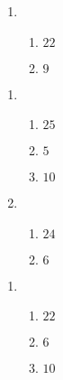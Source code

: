 \documentclass[12pt,twoside]{article}
\makeatletter
\def\emptycleardoublepage{\clearpage\if@twoside \ifodd\c@page\else
\thispagestyle{empty}%
\hbox{}\newpage\if@twocolumn\hbox{}\newpage\fi\fi\fi}
\makeatother
\begin{document}
\begin{multicols}{2}
\begin{enumerate}
\item \begin{enumerate}
\def \a{7}\def \b{15}\def \apb{22}
\item $\apb$
\def \a{3}\def \b{6}\def \ab{9}
\item $\ab$
\def \vshift{1}\def \hshift{2}\def \chang{2}\def \findval{4}\def \yval{-3}
\end{enumerate}
\end{enumerate}\end{multicols}\emptycleardoublepage{}\graphicspath{{C:/Users/iainc/anaconda3/Randomizer/Sample Course/Sample Assessment 2/}}\begin{multicols}{2} \begin{enumerate}
\item \begin{enumerate}
\def \a{9}\def \b{16}\def \apb{25}
\item $\apb$
\def \a{13}\def \dif{5}\def \b{8}
\item $\dif$
\def \a{3}\def \b{7}\def \ab{10}
\item $\ab$
\def \vshift{-1}\def \hshift{4}\def \chang{0}\def \findval{4}\def \yval{-1}
\end{enumerate}

\item \begin{enumerate}
\def \a{6}\def \b{18}\def \apb{24}
\item $\apb$
\def \a{14}\def \dif{6}\def \b{8}
\item $\dif$
\def \vshift{3}\def \hshift{-4}\def \chang{-1}\def \findval{-5}\def \yval{5}
\end{enumerate}
\end{enumerate}\end{multicols}\emptycleardoublepage{}\graphicspath{{C:/Users/iainc/anaconda3/Randomizer/Sample Course/Sample Assessment 2/}}\begin{multicols}{2} \begin{enumerate}
\item \begin{enumerate}
\def \a{6}\def \b{16}\def \apb{22}
\item $\apb$
\def \a{14}\def \dif{6}\def \b{8}
\item $\dif$
\def \a{4}\def \b{6}\def \ab{10}
\item $\ab$
\def \vshift{-1}\def \hshift{0}\def \chang{-1}\def \findval{-1}\def \yval{1}
\end{enumerate}


\end{enumerate}
\end{multicols}
\end{document}
